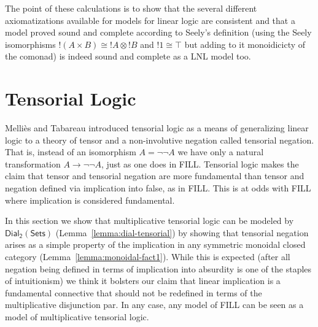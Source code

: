 \documentclass{elsarticle}
\newcommand{\dial}[0]{\mathsf{Dial_2}(\mathsf{Sets})}
\begin{document}

The point of these calculations is to show that the several different
axiomatizations available for models for linear logic are consistent
and that a model proved sound and complete according to Seely's
definition (using the Seely isomorphisms $!(A \times B)\cong !A\otimes
!B$ and $!1\cong \top$ but adding to it monoidicicty of the comonad)
is indeed sound and complete as a LNL model too.

\section{Tensorial Logic}
\label{sec:tensor_logic}

Melli\`es and Tabareau introduced tensorial logic \cite{Mellies:2008} as a means of
generalizing linear logic to a theory of tensor and a non-involutive
negation called tensorial negation.  That is, instead of an
isomorphism $A = \lnot\lnot A$ we have only a natural transformation
$A \to \lnot\lnot A$, just as one does in FILL.  Tensorial logic makes the
claim that tensor and tensorial negation are more fundamental than
tensor and negation defined via implication into false, as in FILL.  This is at odds with
FILL where implication is considered  fundamental. 

In this
section we show that multiplicative tensorial logic can be modeled by
$\dial$ (Lemma~\ref{lemma:dial-tensorial}) by showing that tensorial
negation arises as a simple property of the implication in any symmetric monoidal closed category
(Lemma~\ref{lemma:monoidal-fact1}).  While this is expected (after all
negation being defined in terms of implication into absurdity is one
of the staples of intuitionism) we think it bolsters our claim that
linear implication is a fundamental connective that should not be
redefined in terms of the multiplicative disjunction par.  In any
case, any model of FILL can be seen as a model of multiplicative
tensorial logic.  
\end{document}
